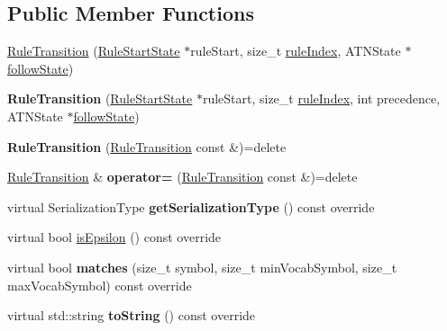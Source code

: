 \subsection*{Public Member Functions}
\begin{DoxyCompactItemize}
\item 
\hyperlink{classantlr4_1_1atn_1_1RuleTransition_a231adc7c039edce028eacf27526bd6b2}{Rule\+Transition} (\hyperlink{classantlr4_1_1atn_1_1RuleStartState}{Rule\+Start\+State} $\ast$rule\+Start, size\+\_\+t \hyperlink{classantlr4_1_1atn_1_1RuleTransition_a061f690f1db9171f23d70e38b6fc2ec3}{rule\+Index}, A\+T\+N\+State $\ast$\hyperlink{classantlr4_1_1atn_1_1RuleTransition_a9ba63114a2ee50709140026ca76b9a99}{follow\+State})
\item 
\mbox{\label{classantlr4_1_1atn_1_1RuleTransition_aeecb4b5ead4ffe23c97b3ea64e57d111}} 
{\bfseries Rule\+Transition} (\hyperlink{classantlr4_1_1atn_1_1RuleStartState}{Rule\+Start\+State} $\ast$rule\+Start, size\+\_\+t \hyperlink{classantlr4_1_1atn_1_1RuleTransition_a061f690f1db9171f23d70e38b6fc2ec3}{rule\+Index}, int precedence, A\+T\+N\+State $\ast$\hyperlink{classantlr4_1_1atn_1_1RuleTransition_a9ba63114a2ee50709140026ca76b9a99}{follow\+State})
\item 
\mbox{\label{classantlr4_1_1atn_1_1RuleTransition_aaaecf4a0a2fecd545a04d69fd26b987c}} 
{\bfseries Rule\+Transition} (\hyperlink{classantlr4_1_1atn_1_1RuleTransition}{Rule\+Transition} const \&)=delete
\item 
\mbox{\label{classantlr4_1_1atn_1_1RuleTransition_a86f26f4e1f47fa850113b8e00ae0c976}} 
\hyperlink{classantlr4_1_1atn_1_1RuleTransition}{Rule\+Transition} \& {\bfseries operator=} (\hyperlink{classantlr4_1_1atn_1_1RuleTransition}{Rule\+Transition} const \&)=delete
\item 
\mbox{\label{classantlr4_1_1atn_1_1RuleTransition_ad8f28809d50d4c753fcaa7699a49fc78}} 
virtual Serialization\+Type {\bfseries get\+Serialization\+Type} () const override
\item 
virtual bool \hyperlink{classantlr4_1_1atn_1_1RuleTransition_a899ddb9161a918c929cd90371aeec15b}{is\+Epsilon} () const override
\item 
\mbox{\label{classantlr4_1_1atn_1_1RuleTransition_a5bb8c825bf3b5ebdf1c8511c728df6cc}} 
virtual bool {\bfseries matches} (size\+\_\+t symbol, size\+\_\+t min\+Vocab\+Symbol, size\+\_\+t max\+Vocab\+Symbol) const override
\item 
\mbox{\label{classantlr4_1_1atn_1_1RuleTransition_af49b98f3a3c4c26194ee44af455eba81}} 
virtual std\+::string {\bfseries to\+String} () const override
\end{DoxyCompactItemize}
